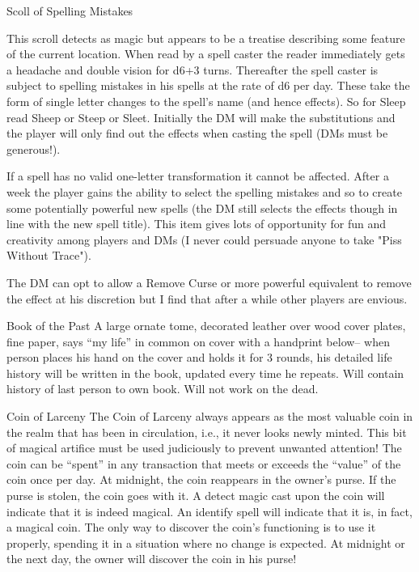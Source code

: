 Scoll of Spelling Mistakes

This scroll detects as magic but appears to be a treatise describing some feature of the current location. When read by a spell caster the reader immediately gets a headache and double vision for d6+3 turns. Thereafter the spell caster is subject to spelling mistakes in his spells at the rate of d6 per day. These take the form of single letter changes to the spell's name (and hence effects). So for Sleep read Sheep or Steep or Sleet. Initially the DM will make the substitutions and the player will only find out the effects when casting the spell (DMs must be generous!).

If a spell has no valid one-letter transformation it cannot be affected. After a week the player gains the ability to select the spelling mistakes and so to create some potentially powerful new spells (the DM still selects the effects though in line with the new spell title). This item gives lots of opportunity for fun and creativity among players and DMs (I never could persuade anyone to take "Piss Without Trace").

The DM can opt to allow a Remove Curse or more powerful equivalent to remove the effect at his discretion but I find that after a while other players are envious.


Book of the Past
A large ornate tome, decorated leather over wood cover plates, fine paper, says “my life” in common on cover with a handprint below– when person places his hand on the cover and holds it for 3 rounds, his detailed life history will be written in the book, updated every time he repeats. Will contain history of last person to own book. Will not work on the dead.


Coin of Larceny
The Coin of Larceny always appears as the most valuable coin in the realm that has been in circulation, i.e., it never looks newly minted. This bit of magical artifice must be used judiciously to prevent unwanted attention! The coin can be “spent” in any transaction that meets or exceeds the “value” of the coin once per day.  At midnight, the coin reappears in the owner’s purse. If the purse is stolen, the coin goes with it. A detect magic cast upon the coin will indicate that it is indeed magical. An identify spell will indicate that it is, in fact, a magical coin. The only way to discover the coin’s functioning is to use it properly, spending it in a situation where no change is expected. At midnight or the next day, the owner will discover the coin in his purse! 



